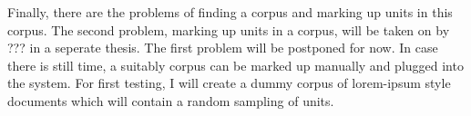 \documentclass[11pt]{article}
\begin{document}
Finally, there are the problems of finding a corpus and marking up units in this corpus. The second problem, marking up units in a corpus, will be taken on by ??? in a seperate thesis. The first problem will be postponed for now. In case there is still time, a suitably corpus can be marked up manually and plugged into the system. For first testing, I will create a dummy corpus of lorem-ipsum style documents which will contain a random sampling of units.


\end{document}
